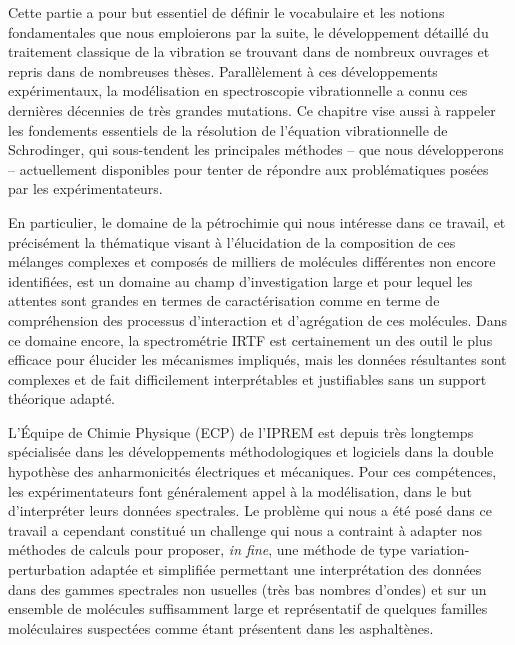 Cette partie a pour but essentiel de définir le vocabulaire et les notions fondamentales que nous emploierons par la suite, le développement détaillé du traitement classique de la vibration se trouvant dans de nombreux ouvrages  et repris dans de nombreuses thèses. Parallèlement à ces développements expérimentaux, la modélisation en spectroscopie vibrationnelle a connu ces dernières décennies de très grandes mutations. Ce chapitre vise aussi à rappeler les fondements essentiels de la résolution de l'équation vibrationnelle de Schrodinger, qui sous-tendent les principales méthodes -- que nous développerons -- actuellement disponibles pour tenter de répondre aux problématiques posées par les expérimentateurs. 


En particulier, le domaine de la pétrochimie qui nous intéresse dans ce travail, et précisément la thématique visant à l'élucidation de la composition de ces mélanges complexes et composés de milliers de molécules différentes non encore identifiées, est un domaine au champ d'investigation large et pour lequel les attentes sont grandes en termes de caractérisation comme en terme de compréhension des processus d’interaction et d’agrégation de ces molécules. Dans ce domaine encore, la spectrométrie IRTF est certainement un des outil le plus efficace pour élucider les mécanismes impliqués, mais les données résultantes sont complexes et de fait difficilement interprétables et justifiables sans un support théorique adapté.

L'Équipe de Chimie Physique (ECP) de l'IPREM est depuis très longtemps spécialisée dans les développements méthodologiques et logiciels dans la double hypothèse des anharmonicités électriques et mécaniques. Pour ces compétences, les expérimentateurs  font généralement appel à la modélisation, dans le but d'interpréter leurs données spectrales.
Le problème qui nous a été posé dans ce travail a cependant constitué un challenge qui nous a contraint à adapter nos méthodes de calculs pour proposer, \textit{in fine}, une méthode de type variation-perturbation adaptée et simplifiée permettant une interprétation des données dans des gammes spectrales non usuelles (très bas nombres d’ondes) et sur un ensemble de molécules suffisamment large et représentatif de quelques familles moléculaires suspectées comme étant présentent dans les asphaltènes. 


\newpage

